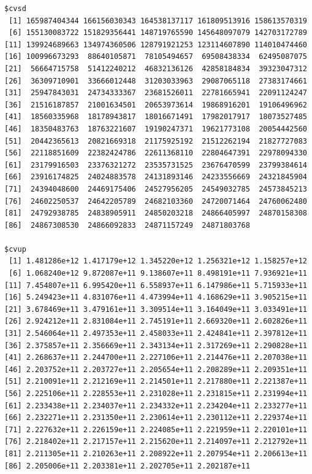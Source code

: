 \documentclass[
]{article}
\begin{document}
\begin{verbatim}
$cvsd
 [1] 165987404344 166156030343 164538137117 161809513916 158613570319
 [6] 155130083722 151829356441 148719765590 145648097079 142703172789
[11] 139924689663 134974360506 128791921253 123114607890 114010474460
[16] 100996673293  88640105871  78105494657  69508438334  62495087075
[21]  56664715758  51412240212  46832136126  42858184834  39323047312
[26]  36309710901  33666012448  31203033963  29087065118  27383174661
[31]  25947843031  24734333367  23681526011  22781665941  22091124247
[36]  21516187857  21001634501  20653973614  19868916201  19106496962
[41]  18560335968  18178943817  18016671491  17982017917  18073527485
[46]  18350483763  18763221607  19190247371  19621773108  20054442560
[51]  20442365613  20821669318  21175925192  21512262194  21827727083
[56]  22118851609  22382424786  22611368110  22804647391  22978094330
[61]  23179916503  23376321272  23535731525  23676470599  23799384614
[66]  23916174825  24024883578  24131893146  24233556669  24321845904
[71]  24394048600  24469175406  24527956205  24549032785  24573845213
[76]  24602250537  24642205789  24682103360  24720071464  24760062480
[81]  24792938785  24838905911  24850203218  24866405997  24870158308
[86]  24867308530  24866092833  24871157249  24871803768

$cvup
 [1] 1.481286e+12 1.417179e+12 1.345220e+12 1.256321e+12 1.158257e+12
 [6] 1.068240e+12 9.872087e+11 9.138607e+11 8.498191e+11 7.936921e+11
[11] 7.454807e+11 6.995420e+11 6.558937e+11 6.147986e+11 5.715933e+11
[16] 5.249423e+11 4.831076e+11 4.473994e+11 4.168629e+11 3.905215e+11
[21] 3.678469e+11 3.479161e+11 3.309514e+11 3.164049e+11 3.033491e+11
[26] 2.924212e+11 2.831084e+11 2.745191e+11 2.669320e+11 2.602826e+11
[31] 2.546064e+11 2.497353e+11 2.458033e+11 2.424841e+11 2.397812e+11
[36] 2.375857e+11 2.356669e+11 2.343134e+11 2.317269e+11 2.290828e+11
[41] 2.268637e+11 2.244700e+11 2.227106e+11 2.214476e+11 2.207038e+11
[46] 2.203752e+11 2.203727e+11 2.205654e+11 2.208289e+11 2.209351e+11
[51] 2.210091e+11 2.212169e+11 2.214501e+11 2.217880e+11 2.221387e+11
[56] 2.225106e+11 2.228553e+11 2.231028e+11 2.231815e+11 2.231994e+11
[61] 2.233438e+11 2.234037e+11 2.234332e+11 2.234204e+11 2.233277e+11
[66] 2.232271e+11 2.231350e+11 2.230614e+11 2.230112e+11 2.229374e+11
[71] 2.227632e+11 2.226159e+11 2.224085e+11 2.221959e+11 2.220101e+11
[76] 2.218402e+11 2.217157e+11 2.215620e+11 2.214097e+11 2.212792e+11
[81] 2.211305e+11 2.210263e+11 2.208922e+11 2.207954e+11 2.206613e+11
[86] 2.205006e+11 2.203381e+11 2.202705e+11 2.202187e+11


\end{verbatim}
\end{document}

